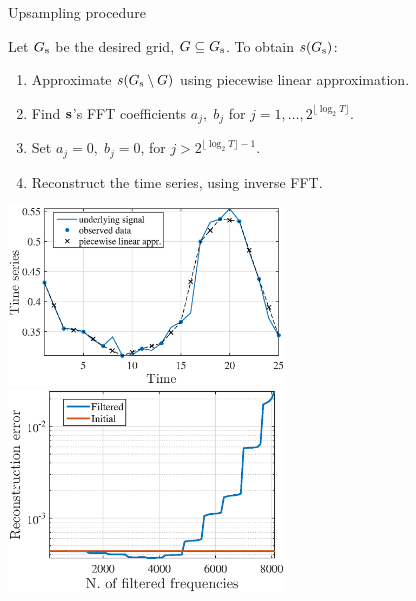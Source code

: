 \documentclass{beamer}
\begin{document}
\begin{frame}{Upsampling procedure}

Let $G_{\text{s}}$ be the desired grid, $G \subseteq G_{\text{s}}$. To obtain $s(G_{\text{s}})$:
\begin{enumerate}
\item Approximate $s(G_{\text{s}}\setminus G)$ using piecewise linear approximation.
\item Find ${\mathbf{s}}$'s FFT coefficients $a_j,\; b_j$ for  $j = 1, \dots, 2^{\lfloor\log_2T\rfloor}$.
\item Set $a_j = 0,\; b_j=0$, for  $j > 2^{{\lfloor\log_2T\rfloor} - 1}$.
\item Reconstruct the time series, using inverse FFT.

\end{enumerate}
\includegraphics[width=0.55\textwidth]{pw_linear_approximation.eps}
\includegraphics[width=0.55\textwidth]{fft_rec_err_upsampling.eps}

\end{frame}
\end{document}
